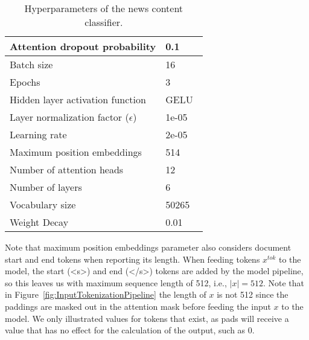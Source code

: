 \begin{table}
    \centering
    \begin{tabular}{|l|l|}
        \hline
        Attention dropout probability           & 0.1                             \\
        \hline
        Batch size                              & 16                              \\
        \hline
        Epochs                                  & 3                               \\
        \hline
        Hidden layer activation function        & GELU~\parencite{GELU_Hendrycks} \\
        \hline
        Layer normalization factor ($\epsilon$) & 1e-05                           \\
        \hline
        Learning rate                           & 2e-05                           \\
        \hline
        Maximum position embeddings             & 514                             \\
        \hline
        Number of attention heads               & 12                              \\
        \hline
        Number of layers                        & 6                               \\
        \hline
        Vocabulary size                         & 50265                           \\
        \hline
        Weight Decay                            & 0.01                            \\
        \hline
    \end{tabular}
    \caption[Hyperparameters of the news content classifier.]{Hyperparameters of the news content classifier.}
    \label{tab:newsContentModelHyperparameters}
\end{table}
Note that maximum position embeddings parameter also considers document start and end tokens when reporting its length. When feeding tokens $x^{tok}$ to the model, the start (<s>) and end (</s>) tokens are added by the model pipeline, so this leaves us with maximum sequence length of 512, i.e., $|x|=512$. Note that in Figure~\ref{fig:InputTokenizationPipeline} the length of $x$ is not 512 since the paddings are masked out in the attention mask before feeding the input $x$ to the model. We only illustrated values for tokens that exist, as pads will receive a value that has no effect for the calculation of the output, such as 0. \\
